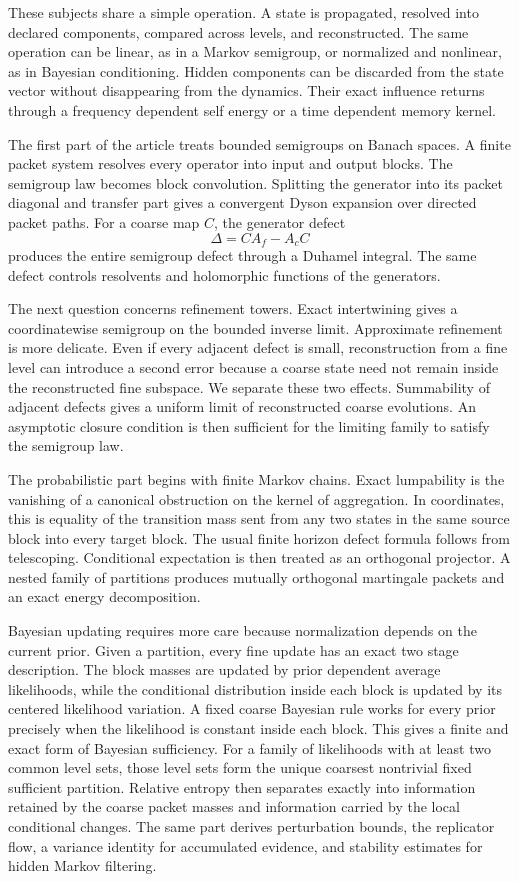 \documentclass{aomart}
\theoremstyle{definition}
\theoremstyle{remark}
\begin{document}
These subjects share a simple operation. A state is propagated, resolved into declared components, compared across levels, and reconstructed. The same operation can be linear, as in a Markov semigroup, or normalized and nonlinear, as in Bayesian conditioning. Hidden components can be discarded from the state vector without disappearing from the dynamics. Their exact influence returns through a frequency dependent self energy or a time dependent memory kernel.

The first part of the article treats bounded semigroups on Banach spaces. A finite packet system resolves every operator into input and output blocks. The semigroup law becomes block convolution. Splitting the generator into its packet diagonal and transfer part gives a convergent Dyson expansion over directed packet paths. For a coarse map \(C\), the generator defect
\[
\Delta=CA_f-A_cC
\]
produces the entire semigroup defect through a Duhamel integral. The same defect controls resolvents and holomorphic functions of the generators.

The next question concerns refinement towers. Exact intertwining gives a coordinatewise semigroup on the bounded inverse limit. Approximate refinement is more delicate. Even if every adjacent defect is small, reconstruction from a fine level can introduce a second error because a coarse state need not remain inside the reconstructed fine subspace. We separate these two effects. Summability of adjacent defects gives a uniform limit of reconstructed coarse evolutions. An asymptotic closure condition is then sufficient for the limiting family to satisfy the semigroup law.

The probabilistic part begins with finite Markov chains. Exact lumpability is the vanishing of a canonical obstruction on the kernel of aggregation. In coordinates, this is equality of the transition mass sent from any two states in the same source block into every target block. The usual finite horizon defect formula follows from telescoping. Conditional expectation is then treated as an orthogonal projector. A nested family of partitions produces mutually orthogonal martingale packets and an exact energy decomposition.

Bayesian updating requires more care because normalization depends on the current prior. Given a partition, every fine update has an exact two stage description. The block masses are updated by prior dependent average likelihoods, while the conditional distribution inside each block is updated by its centered likelihood variation. A fixed coarse Bayesian rule works for every prior precisely when the likelihood is constant inside each block. This gives a finite and exact form of Bayesian sufficiency. For a family of likelihoods with at least two common level sets, those level sets form the unique coarsest nontrivial fixed sufficient partition. Relative entropy then separates exactly into information retained by the coarse packet masses and information carried by the local conditional changes. The same part derives perturbation bounds, the replicator flow, a variance identity for accumulated evidence, and stability estimates for hidden Markov filtering.
\end{document}
